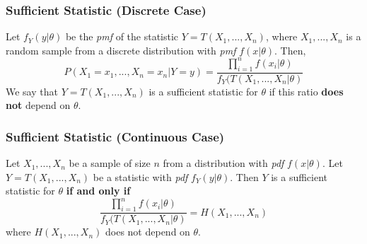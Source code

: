 \documentclass{article}
\begin{document}
\subsubsection{Sufficient Statistic (Discrete Case)}
Let $f_Y(y|\theta)$ be the \textit{pmf} of the statistic $Y=T(X_1,...,X_n)$, where $X_1,...,X_n$ is a random sample from a discrete distribution with \textit{pmf} $f(x|\theta)$. Then,
\begin{equation*}
    P(X_1 = x_1,...,X_n=x_n|Y=y) = \frac{\prod_{i=1}^n f(x_i|\theta)}{f_Y(T(X_1,...,X_n|\theta)}
\end{equation*}
We say that $Y=T(X_1,...,X_n)$ is a sufficient statistic for $\theta$ if this ratio \textbf{does not} depend on $\theta$.

\subsubsection{Sufficient Statistic (Continuous Case)}
Let $X_1,...,X_n$ be a sample of size $n$ from a distribution with \textit{pdf} $f(x|\theta)$. Let $Y=T(X_1,...,X_n)$ be a statistic with \textit{pdf} $f_Y(y|\theta)$. Then $Y$ is a sufficient statistic for $\theta$ \textbf{if and only if}
\begin{equation*}
    \frac{\prod_{i=1}^n f(x_i|\theta)}{f_Y(T(X_1,...,X_n|\theta)} = H(X_1,...,X_n)
\end{equation*}
where $H(X_1,...,X_n)$ does not depend on $\theta$.
\end{document}
